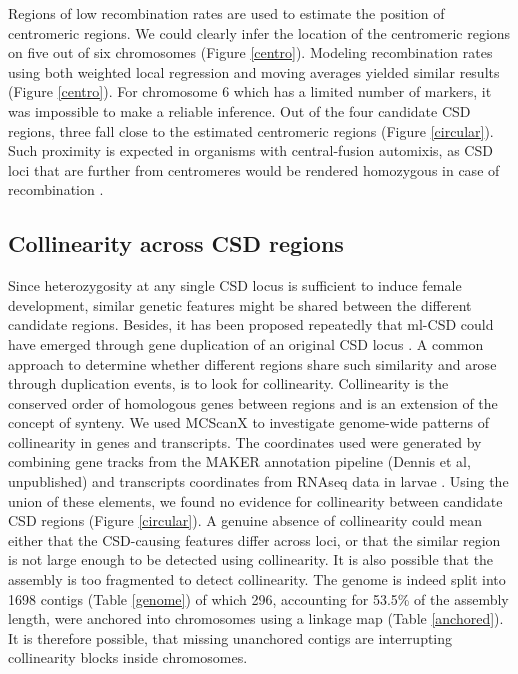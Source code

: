 \documentclass[11pt,a4paper]{report}
\begin{document}
Regions of low recombination rates are used to estimate the position of centromeric regions. We could clearly infer the location of the centromeric regions on five out of six chromosomes (Figure \ref{centro}). Modeling recombination rates using both weighted local regression and moving averages yielded similar results (Figure \ref{centro}). For chromosome 6 which has a limited number of markers, it was impossible to make a reliable inference. Out of the four candidate CSD regions, three fall close to the estimated centromeric regions (Figure \ref{circular}). Such proximity is expected in organisms with central-fusion automixis, as CSD loci that are further from centromeres would be rendered homozygous in case of recombination \citep{Vorburger2014}.

\subsection{Collinearity across CSD regions}
Since heterozygosity at any single CSD locus is sufficient to induce female development, similar genetic features might be shared between the different candidate regions. Besides, it has been proposed repeatedly that ml-CSD could have emerged through gene duplication of an original CSD locus \citep{Schmieder2012TracingAnts,Boer2008ExperimentalVestalis}. A common approach to determine whether different regions share such similarity and arose through duplication events, is to look for collinearity. Collinearity is the conserved order of homologous genes between regions and is an extension of the concept of synteny. We used MCScanX \citep{Wang2012MCScanX:Collinearity} to investigate genome-wide patterns of collinearity in genes and transcripts. The coordinates used were generated by combining gene tracks from the MAKER annotation pipeline (Dennis et al, unpublished) and transcripts coordinates from RNAseq data in larvae \citep{Dennis2017ParasitoidHosts}. Using the union of these elements, we found no evidence for collinearity between candidate CSD regions (Figure \ref{circular}). A genuine absence of collinearity could mean either that the CSD-causing features differ across loci, or that the similar region is not large enough to be detected using collinearity. It is also possible that the assembly is too fragmented to detect collinearity. The genome is indeed split into 1698 contigs (Table \ref{genome}) of which 296, accounting for 53.5\% of the assembly length, were anchored into chromosomes using a linkage map (Table \ref{anchored}). It is therefore possible, that missing unanchored contigs are interrupting collinearity blocks inside chromosomes.
\end{document}
